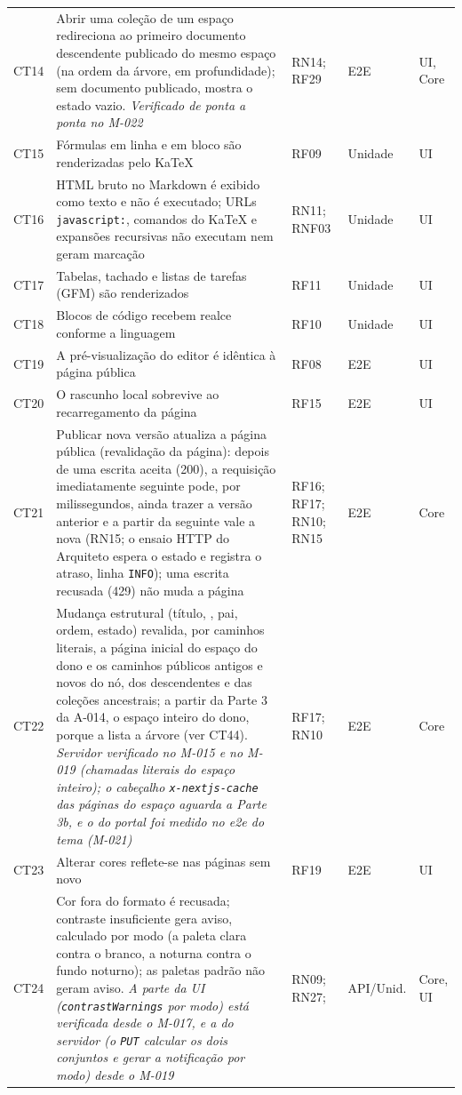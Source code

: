 \begin{longtable}{@{}L{1.1cm}L{7.0cm}L{2.2cm}L{1.6cm}L{1.6cm}@{}}
CT14 & Abrir uma coleção de um espaço redireciona ao primeiro documento descendente publicado do mesmo espaço (na ordem da árvore, em profundidade); sem documento publicado, mostra o estado vazio. \emph{Verificado de ponta a ponta no M-022} & RN14; RF29 & E2E & UI, Core\\[2pt]
CT15 & Fórmulas em linha e em bloco são renderizadas pelo KaTeX & RF09 & Unidade & UI\\[2pt]
CT16 & HTML bruto no Markdown é exibido como texto e não é executado; URLs \texttt{javascript:}, comandos do KaTeX e expansões recursivas não executam nem geram marcação & RN11; RNF03 & Unidade & UI\\[2pt]
CT17 & Tabelas, tachado e listas de tarefas (GFM) são renderizados & RF11 & Unidade & UI\\[2pt]
CT18 & Blocos de código recebem realce conforme a linguagem & RF10 & Unidade & UI\\[2pt]
CT19 & A pré-visualização do editor é idêntica à página pública & RF08 & E2E & UI\\[2pt]
CT20 & O rascunho local sobrevive ao recarregamento da página & RF15 & E2E & UI\\[2pt]
CT21 & Publicar nova versão atualiza a página pública (revalidação da página): depois de uma escrita aceita (200), a requisição imediatamente seguinte pode, por milissegundos, ainda trazer a versão anterior e a partir da seguinte vale a nova (RN15; o ensaio HTTP do Arquiteto espera o estado e registra o atraso, linha \texttt{INFO}); uma escrita recusada (429) não muda a página & RF16; RF17; RN10; RN15 & E2E & Core\\[2pt]
CT22 & Mudança estrutural (título, , pai, ordem, estado) revalida, por caminhos literais, a página inicial do espaço do dono e os caminhos públicos antigos e novos do nó, dos descendentes e das coleções ancestrais; a partir da Parte 3 da A-014, o espaço inteiro do dono, porque a  lista a árvore (ver CT44). \emph{Servidor verificado no M-015 e no M-019 (chamadas literais do espaço inteiro); o cabeçalho \texttt{x-nextjs-cache} das páginas do espaço aguarda a Parte 3b, e o do portal foi medido no e2e do tema (M-021)} & RF17; RN10 & E2E & Core\\[2pt]
CT23 & Alterar cores reflete-se nas páginas sem novo  & RF19 & E2E & UI\\[2pt]
CT24 & Cor fora do formato é recusada; contraste insuficiente gera aviso, calculado por modo (a paleta clara contra o branco, a noturna contra o fundo noturno); as paletas padrão não geram aviso. \emph{A parte da UI (\texttt{contrastWarnings} por modo) está verificada desde o M-017, e a do servidor (o \texttt{PUT} calcular os dois conjuntos e gerar a notificação por modo) desde o M-019} & RN09; RN27;  & API/Unid. & Core, UI\\[2pt]

\end{longtable}
